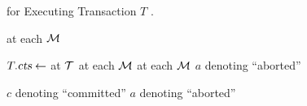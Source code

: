 \setcounter{algorithm}{1}
\begin{algorithm}[H]
  \caption{\rvsimp{} for Executing Transaction $T$ .}
  \begin{algorithmic}[1]
      	\label{line:rvsimp-ccommit}
	\State {}
	  \label{line:rvsimp-partition}
	  \hStatex

	  \State {}  at each $\mathcal{M}$
		\label{line:rvsimp-call-prepare}

		\label{line:rvsimp-prepare-all-true}
	  \State $T.\textsl{cts} \gets$  
		 at $\mathcal{T}$
		  \label{line:rvsimp-coord-call-getts}
		\State {}  at each $\mathcal{M}$
		  \label{line:rvsimp-coord-call-commit}
      \Else
        \State {}  at each $\mathcal{M}$
		  \label{line:rvsimp-coord-call-abort}
        \State \Return $a$ denoting ``aborted''
      \EndIf

        \State \Return $c$ denoting ``committed''
	  \Else
		\State \Return $a$ denoting ``aborted''
      \EndIf
    \EndProcedure
  \end{algorithmic}
\end{algorithm}
